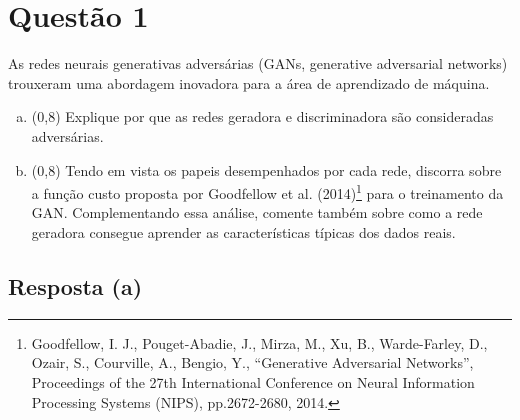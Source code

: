 \documentclass[final,3p]{elsarticle}
\numberwithin{equation}{section}
\begin{document}
\begin{frontmatter}





\end{frontmatter}

\section{Questão 1}

    As redes neurais generativas adversárias (GANs, generative adversarial networks) trouxeram uma abordagem inovadora para a área de aprendizado de máquina.

    \begin{enumerate}[(a)]
        \item (0,8) Explique por que as redes geradora e discriminadora são consideradas adversárias.
        \item (0,8) Tendo em vista os papeis desempenhados por cada rede, discorra sobre a função custo proposta por Goodfellow et al. (2014)\footnote{Goodfellow, I. J., Pouget-Abadie, J., Mirza, M., Xu, B., Warde-Farley, D., Ozair, S., Courville, A., Bengio, Y., “Generative Adversarial Networks”, Proceedings of the 27th International Conference on Neural Information Processing Systems (NIPS), pp.2672-2680, 2014.} para o treinamento da GAN. Complementando essa análise, comente também sobre como a rede geradora consegue aprender as características típicas dos dados reais.
    \end{enumerate}

    \subsection{Resposta \textbf{(a)}}
\end{document}

